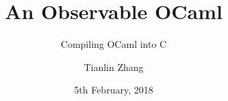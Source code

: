 \documentclass[pdf]{beamer}
\title{An Observable OCaml}
\subtitle{Compiling OCaml into C}
\author{Tianlin Zhang}
\date{5th February, 2018}
\begin{document}
\begin{frame}
\titlepage
\end{frame}

\end{document}
